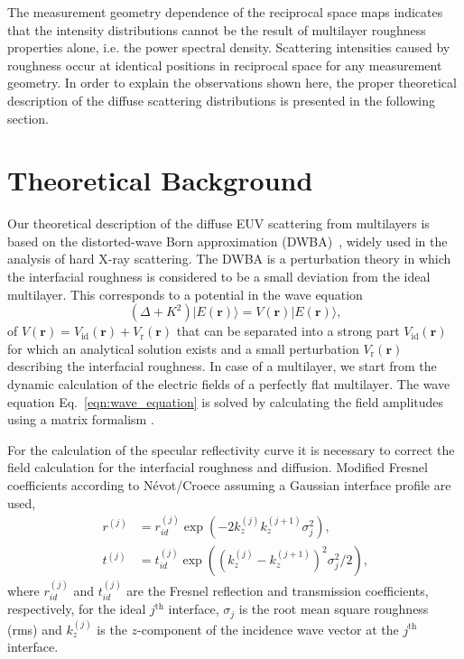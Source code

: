 \documentclass[twocolumn,osajnl,showpacs,superscriptaddress,11pt]{revtex4-1}
\begin{document}
The measurement geometry dependence of the reciprocal space maps indicates that the intensity distributions cannot be the result of multilayer roughness properties alone, i.e. the power spectral density. Scattering intensities caused by roughness occur at identical positions in reciprocal space for any measurement geometry. In order to explain the observations shown here, the proper theoretical description of the diffuse scattering distributions is presented in the following section.

\section{Theoretical Background} \label{sec:theory} Our theoretical description of the diffuse EUV scattering from multilayers is based on the distorted-wave Born approximation (DWBA)~\cite{PhysRevB.49.10668,PhysRevB.47.15896}, widely used in the analysis of hard X-ray scattering. The DWBA is a perturbation theory in which the interfacial roughness is considered to be a small deviation from the ideal multilayer. This corresponds to a potential in the wave equation 
\begin{equation}
	(\Delta + K^2) |E(\mathbf{r})\rangle = V(\mathbf{r}) |E(\mathbf{r})\rangle\text{,} \label{eqn:wave_equation} 
\end{equation}
of $V(\mathbf{r}) = V_\text{id}(\mathbf{r}) + V_\text{r}(\mathbf{r})$ that can be separated into a strong part $V_\text{id}(\mathbf{r})$ for which an analytical solution exists and a small perturbation $V_\text{r}(\mathbf{r})$ describing the interfacial roughness. In case of a multilayer, we start from the dynamic calculation of the electric fields of a perfectly flat multilayer. The wave equation Eq.~\eqref{eqn:wave_equation} is solved by calculating the field amplitudes using a matrix formalism \cite{PrinciplesOfOptics}.

For the calculation of the specular reflectivity curve it is necessary to correct the field calculation for the interfacial roughness and diffusion. Modified Fresnel coefficients according to N\'evot/Croece \cite{nevot_croece} assuming a Gaussian interface profile are used, 
\begin{align}
	r^{(j)} &= r_{id}^{(j)} \exp(-2 k_z^{(j)} k_z^{(j+1)} \sigma_j^2)\text{,} \label{eqn:fresnel_r}\\
	t^{(j)} &= t_{id}^{(j)} \exp((k_z^{(j)} - k_z^{(j+1)})^2 \sigma_j^2/2) \text{,} \label{eqn:fresnel_t}
\end{align}
where $r_{id}^{(j)}$ and $t_{id}^{(j)}$ are the Fresnel reflection and transmission coefficients, respectively, for the ideal  $j^\text{th}$ interface, $\sigma_j$ is the root mean square roughness (rms) and $k_z^{(j)}$ is the $z$-component of the incidence wave vector at the $j^\text{th}$ interface.
\end{document}
